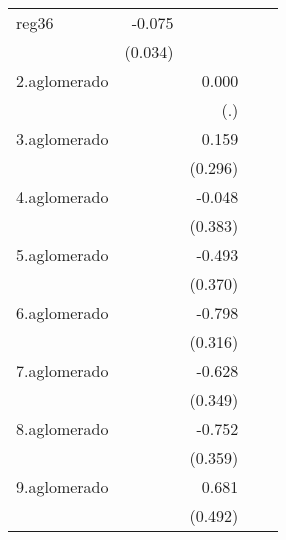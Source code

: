 {\begin{longtable}{l*{4}{D{.}{.}{-1}}}
\addlinespace
reg36       &      -0.075\sym{*}  &                     &                     &                     \\
            &     (0.034)         &                     &                     &                     \\
\addlinespace
2.aglomerado&                     &       0.000         &                     &                     \\
            &                     &         (.)         &                     &                     \\
\addlinespace
3.aglomerado&                     &       0.159         &                     &                     \\
            &                     &     (0.296)         &                     &                     \\
\addlinespace
4.aglomerado&                     &      -0.048         &                     &                     \\
            &                     &     (0.383)         &                     &                     \\
\addlinespace
5.aglomerado&                     &      -0.493         &                     &                     \\
            &                     &     (0.370)         &                     &                     \\
\addlinespace
6.aglomerado&                     &      -0.798\sym{*}  &                     &                     \\
            &                     &     (0.316)         &                     &                     \\
\addlinespace
7.aglomerado&                     &      -0.628         &                     &                     \\
            &                     &     (0.349)         &                     &                     \\
\addlinespace
8.aglomerado&                     &      -0.752\sym{*}  &                     &                     \\
            &                     &     (0.359)         &                     &                     \\
\addlinespace
9.aglomerado&                     &       0.681         &                     &                     \\
            &                     &     (0.492)         &                     &                     \\

\end{longtable}}
